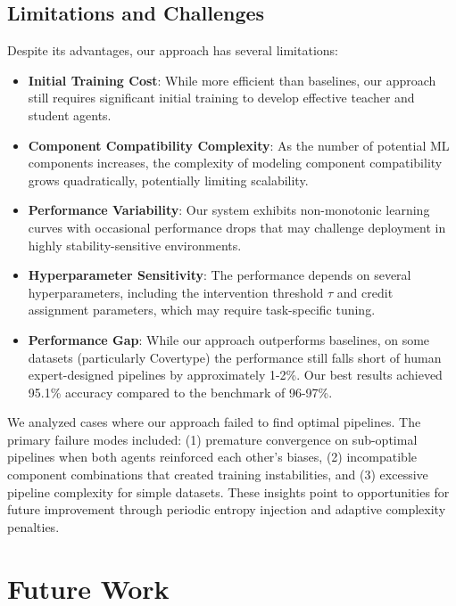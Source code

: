 \documentclass[twoside,11pt]{article}
\begin{document}
\subsection{Limitations and Challenges}

Despite its advantages, our approach has several limitations:

\begin{itemize}
    \item \textbf{Initial Training Cost}: While more efficient than baselines, our approach still requires significant initial training to develop effective teacher and student agents.
    
    \item \textbf{Component Compatibility Complexity}: As the number of potential ML components increases, the complexity of modeling component compatibility grows quadratically, potentially limiting scalability.
    
    \item \textbf{Performance Variability}: Our system exhibits non-monotonic learning curves with occasional performance drops that may challenge deployment in highly stability-sensitive environments.
    
    \item \textbf{Hyperparameter Sensitivity}: The performance depends on several hyperparameters, including the intervention threshold $\tau$ and credit assignment parameters, which may require task-specific tuning.
    
    \item \textbf{Performance Gap}: While our approach outperforms baselines, on some datasets (particularly Covertype) the performance still falls short of human expert-designed pipelines by approximately 1-2\%. Our best results achieved 95.1\% accuracy compared to the benchmark of 96-97\%.
\end{itemize}

We analyzed cases where our approach failed to find optimal pipelines. The primary failure modes included: (1) premature convergence on sub-optimal pipelines when both agents reinforced each other's biases, (2) incompatible component combinations that created training instabilities, and (3) excessive pipeline complexity for simple datasets. These insights point to opportunities for future improvement through periodic entropy injection and adaptive complexity penalties.

\section{Future Work}
\end{document}
